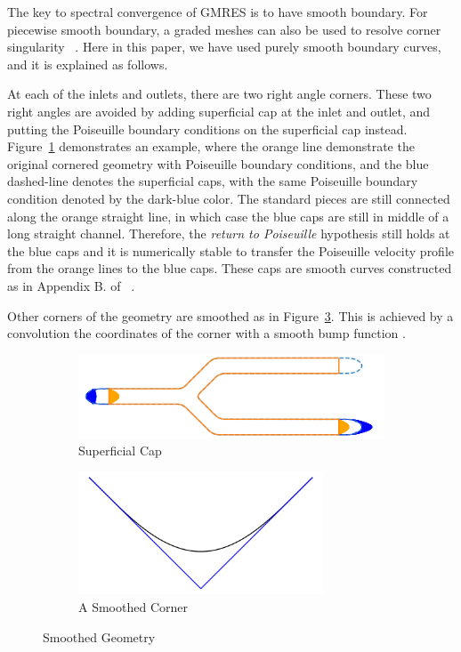 \documentclass[10pt,twocolumn,letterpaper]{article}
\begin{document}
The key to spectral convergence of GMRES is to have smooth boundary. 
For piecewise smooth boundary, 
a graded meshes can also be used to resolve corner singularity
~\cite{wuSolutionStokesFlow2020}. 
Here in this paper, we have used purely smooth boundary curves, 
and it is explained as follows.

At each of the inlets and outlets, there are two right angle corners. 
These two right angles are avoided by adding superficial cap at the inlet and outlet, 
and putting the Poiseuille boundary conditions on the superficial cap instead. 
Figure~\ref{fig:superficial-cap} demonstrates an example, 
where the orange line demonstrate the original cornered geometry with Poiseuille boundary
conditions, and the blue dashed-line denotes the superficial caps, 
with the same Poiseuille boundary condition denoted by the dark-blue color. 
The standard pieces are still connected along the orange straight line, 
in which case the blue caps are still in middle of a long straight channel. 
Therefore, the \textit{return to Poiseuille} hypothesis still holds at the 
blue caps and it is numerically stable to 
transfer the Poiseuille velocity profile from the orange lines 
to the blue caps. 
These caps are smooth curves constructed as in Appendix B. of
~\cite{baggeHighlyAccurateSpecial2021}. 

Other corners of the geometry are smoothed as in Figure~\ref{fig:smooth-corner}. 
This is achieved by a convolution the coordinates of the corner 
with a smooth bump function \cite{epsteinSmoothedCornersScattered2016}.

\begin{figure}[!ht]
  \centering
  \begin{subfigure}[b]{0.4\textwidth}
    \includegraphics[width=\textwidth]{pic/superficial_cap_demo.png}  
    \caption{Superficial Cap}\label{fig:superficial-cap}
  \end{subfigure}
  \begin{subfigure}[b]{0.4\textwidth}
    \includegraphics[width=0.8\textwidth]{pic/smoothed_corner.png}
    \caption{A Smoothed Corner}\label{fig:smooth-corner}
  \end{subfigure}
  \caption{Smoothed Geometry}
\end{figure}
\end{document}

